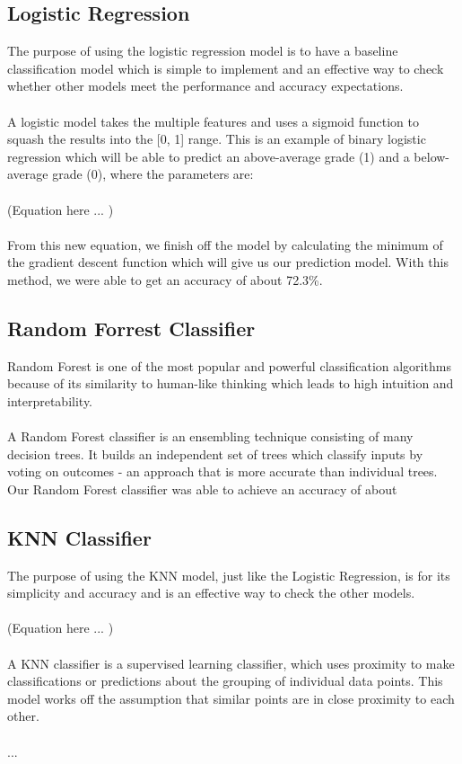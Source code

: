 \documentclass[twoside,twocolumn]{article}
\begin{document}
\subsection{Logistic Regression}
The purpose of using the logistic regression model is to have a baseline classification model which is simple to implement and an effective way to check whether other models meet the performance and accuracy expectations.
\\ \\
A logistic model takes the multiple features and uses a sigmoid function to squash the results into the [0, 1] range. This is an example of binary logistic regression which will be able to predict an above-average grade (1) and a below-average grade (0), where the parameters are:
\\ \\
(Equation here ... )
\\ \\
From this new equation, we finish off the model by calculating the minimum of the gradient descent function which will give us our prediction model. With this method, we were able to get an accuracy of about 72.3\%. 

\subsection{Random Forrest Classifier}
Random Forest is one of the most popular and powerful classification algorithms because of its similarity to human-like thinking which leads to high intuition and interpretability.
\\ \\
A Random Forest classifier is an ensembling technique consisting of many decision trees. It builds an independent set of trees which classify inputs by voting on outcomes - an approach that is more accurate than individual trees. 
Our Random Forest classifier was able to achieve an accuracy of about 

\subsection{KNN Classifier}
The purpose of using the KNN model, just like the Logistic Regression, is for its simplicity and accuracy and is an effective way to check the other models.
\\ \\
(Equation here ... )
\\ \\
A KNN classifier is a supervised learning classifier, which uses proximity to make classifications or predictions about the grouping of individual data points. This model works off the assumption that similar points are in close proximity to each other.
\\ \\
...
\end{document}
